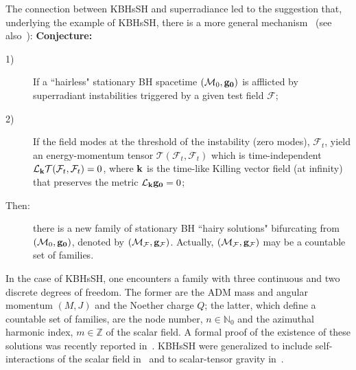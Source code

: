 \bigskip

The connection between KBHsSH and superradiance led to the suggestion that, underlying the example of KBHsSH, there is a more general mechanism~\cite{Herdeiro:2014goa,Herdeiro:2014ima} (see also~\cite{Herdeiro:2015waa,Herdeiro:2015gia}): 
\newpage
{\bf Conjecture:}
\begin{description}
\item[1)] If a ``hairless" stationary BH spacetime $(\mathcal{M}_0,{\bf g_0})$ is afflicted by superradiant instabilities triggered by a given test field $\mathcal{F}$;
\item[2)] If the field modes at the threshold of the instability (zero modes), $\mathcal{F}_t$, yield an energy-momentum tensor $\mathcal{T}(\mathcal{F}_t,\mathcal{F}_t)$ which is time-independent $\mathcal{L}_{\bf k}\mathcal{T}(\mathcal{F}_t,\mathcal{F}_t)=0$, where ${\bf k}$ is the time-like Killing vector field (at infinity) that preserves the metric $\mathcal{L}_{\bf k}{\bf g_0}=0$;
\item[Then:] there is a new family of stationary BH ``hairy solutions" bifurcating from $(\mathcal{M}_0,{\bf g_0})$, denoted by $(\mathcal{M}_\mathcal{F},{\bf g_\mathcal{F}})$. Actually, $(\mathcal{M}_\mathcal{F},{\bf g_\mathcal{F}})$ may be a countable set of families.
\end{description}
In the case of KBHsSH, one encounters a family with three continuous and two discrete degrees of freedom. The former are the ADM mass and angular momentum $(M,J)$ and the Noether charge $Q$; the latter, which define a countable set of families, are the node number, $n\in \mathbb{N}_0$ and the azimuthal harmonic index, $m\in \mathbb{Z}$ of the scalar field. A formal proof of the existence of these solutions was recently reported in~\cite{Chodosh:2015oma}. KBHsSH were generalized to include self-interactions of the scalar field in~\cite{Herdeiro:2015tia} and to scalar-tensor gravity in~\cite{Kleihaus:2015iea}.

\bigskip

